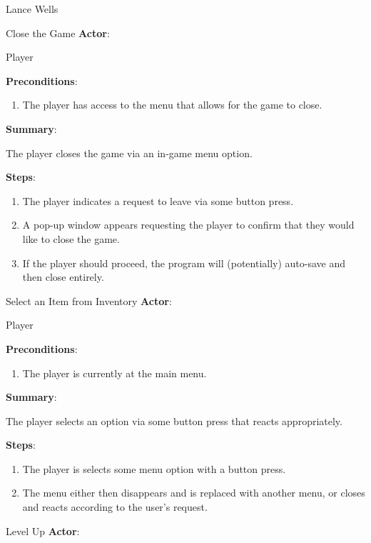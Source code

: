 \documentclass[12pt]{report}
\begin{document}
\begin{section}{Lance Wells}
\begin{subsection}{Close the Game}
\textbf{Actor}:

Player

\textbf{Preconditions}:

\begin{enumerate}
\item The player has access to the menu that allows for the game to close.
\end{enumerate}

\textbf{Summary}:

The player closes the game via an in-game menu option.

\textbf{Steps}:

\begin{enumerate}
\item The player indicates a request to leave via some button press.
\item A pop-up window appears requesting the player to confirm that they
would like to close the game.
\item If the player should proceed, the program will (potentially) auto-save
and then close entirely.
\end{enumerate}
\end{subsection}

\begin{subsection}{Select an Item from Inventory}
\textbf{Actor}:

Player

\textbf{Preconditions}:

\begin{enumerate}
\item The player is currently at the main menu.
\end{enumerate}

\textbf{Summary}:

The player selects an option via some button press that reacts
appropriately.

\textbf{Steps}:

\begin{enumerate}
\item The player is selects some menu option with a button press.
\item The menu either then disappears and is replaced with another menu, or
closes and reacts according to the user's request.
\end{enumerate}
\end{subsection}

\begin{subsection}{Level Up}
\textbf{Actor}:


\end{subsection}
\end{section}
\end{document}
